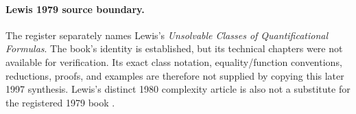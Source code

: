 \paragraph{Lewis 1979 source boundary.}
The register separately names Lewis's \emph{Unsolvable Classes of
Quantificational Formulas}.  The book's identity is established, but its
technical chapters were not available for verification.  Its exact class
notation, equality/function conventions, reductions, proofs, and examples are
therefore not supplied by copying this later 1997 synthesis.  Lewis's distinct
1980 complexity article is also not a substitute for the registered 1979 book
\cite{Lewis1979,Lewis1980}.
